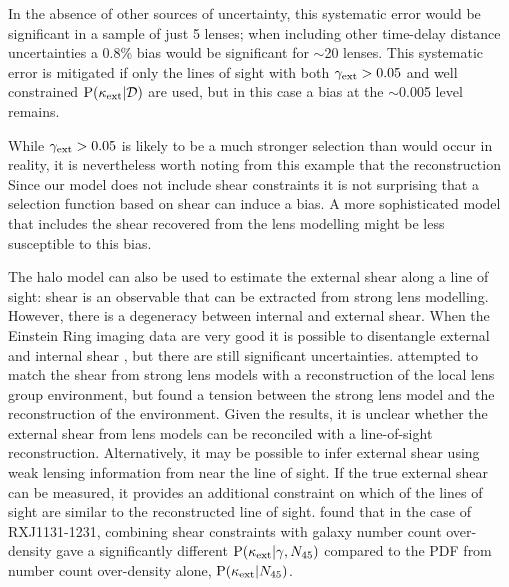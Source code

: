 \documentclass[useAMS,usenatbib,a4paper]{mn2e}
\begin{document}
  In the absence of other sources of
uncertainty, this systematic error would be significant in a sample of just 5
lenses; when including other time-delay distance uncertainties a 0.8\% bias would be
significant for $\sim$20 lenses. This systematic error is mitigated if only the lines of sight with both
$\gamma_{\rm ext}>0.05$ and well constrained ${\rm P}(\kappa_{\rm ext}|{\mathcal{D}})$ are used, but in this
case a bias at the $\sim$0.005 level remains. 

While $\gamma_{\rm ext}>0.05$ is likely to be a much stronger selection than would
occur in reality, it is  nevertheless worth noting from this example that the
reconstruction \proceedure {} Since our model does not include shear
constraints it is not surprising that a selection function based on shear can
induce a bias. A more sophisticated model that includes the shear recovered
from the lens modelling might be less susceptible to this bias.

The halo model can also be used to estimate the external shear along a line of
sight: shear is an observable that can be extracted from strong lens
modelling. However, there is a degeneracy between internal and external shear.
When the Einstein Ring imaging data are very good it is possible to
disentangle external and internal shear \citep[\eg][]{SuyuEtal2010}, but there
are still significant uncertainties. \citet{WongEtal2011} attempted to match
the shear from strong lens models with a reconstruction of the local lens
group environment, but found a tension between the strong lens model and the
reconstruction of the environment. Given the \citet{WongEtal2011} results, it
is unclear whether the external shear from lens models can be reconciled with
a line-of-sight reconstruction. Alternatively, it may be possible  to infer
external shear using weak lensing information from near the line of sight.  If
the true external shear can be measured, it provides an additional constraint
on which of the \MS lines of sight are similar to the reconstructed line of
sight. \citet{SuyuEtal2012} found that in the case of 
RXJ1131-1231, combining shear constraints
with galaxy number count over-density gave a significantly different
${\rm P}(\kappa_{\rm ext}|\gamma,N_{45})$ compared to the PDF from number count
over-density alone, ${\rm P}(\kappa_{\rm ext}|N_{45})$.
\end{document}
